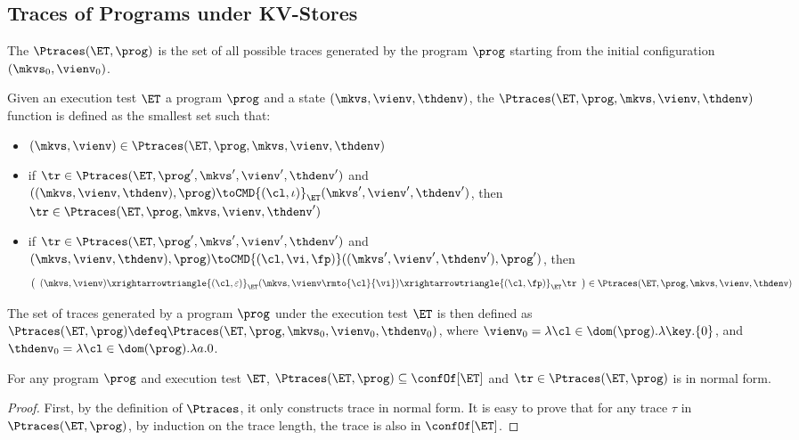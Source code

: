 \subsection{Traces of Programs under KV-Stores}
\label{sec:kv-sound-complete-theorem}

The \( \Ptraces(\ET, \prog) \) is the set of all possible traces generated by the program \( \prog \)
starting from the initial configuration \( ( \mkvs_0, \vienv_0 ) \).

\begin{definition}
Given an execution test $\ET$ a program $\prog$ and a state 
$(\mkvs, \vienv, \thdenv)$, the  $\Ptraces(\ET, \prog, \mkvs, \vienv, \thdenv)$ function
is defined as the smallest set such that:
\begin{itemize}
\item $(\mkvs, \vienv) \in \Ptraces(\ET, \prog, \mkvs, \vienv, \thdenv)$
\item if $\tr \in \Ptraces(\ET, \prog', \mkvs', \vienv',\thdenv')$
and $((\mkvs, \vienv, \thdenv) , \prog) \toCMD{(\cl, \iota)}_{\ET} (\mkvs', \vienv', \thdenv')$, 
then $\tr \in \Ptraces(\ET, \prog, \mkvs, \vienv, \thdenv')$
\item if $\tr \in \Ptraces(\ET, \prog', \mkvs', \vienv', \thdenv')$ and 
$(\mkvs, \vienv, \thdenv), \prog) \toCMD{(\cl, \vi, \fp)} ((\mkvs', \vienv', \thdenv'), \prog')$,  
then 
\[
\left( 
\begin{array}{l}
(\mkvs, \vienv) \xrightarrowtriangle{(\cl, \varepsilon)}_{\ET} 
(\mkvs, \vienv\rmto{\cl}{\vi}) \xrightarrowtriangle{(\cl, \fp)}_{\ET} \tr 
\end{array}
\right) \in \Ptraces(\ET, \prog, \mkvs, \vienv, \thdenv)
\]
\end{itemize}
The set of traces generated by a program $\prog$ under the execution test $\ET$ is 
then defined as $\Ptraces(\ET, \prog) \defeq \Ptraces(\ET, \prog, \mkvs_{0}, \vienv_{0}, \thdenv_{0})$, 
where $\vienv_{0} = \lambda \cl \in \dom(\prog).\lambda \key.\{0\}$, and 
$\thdenv_{0} = \lambda \cl \in \dom(\prog).\lambda a.0$.
\end{definition}


\begin{proposition}
\label{prop:program-trace-in-et-trace}
For any program $\prog$ and execution test $\ET$, 
$\Ptraces(\ET, \prog) \subseteq \confOf[\ET]$ and $\tr \in \Ptraces(\ET, \prog)$ is in normal form. 
\end{proposition}
\begin{proof}
    First, by the definition of \( \Ptraces \), 
    it only constructs trace in normal form.
    It is easy to prove that for any trace \( \tau \) in \( \Ptraces(\ET, \prog) \), by induction on the trace length,
    the trace is also in \( \confOf[\ET] \).
\end{proof}

